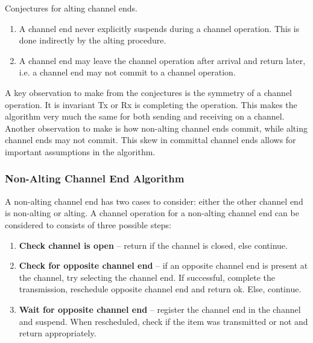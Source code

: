 \begin{enumeratefloat}
    \caption{Conjectures for alting channel ends.}
    \label{list:conjecture_alting}
    \begin{enumerate}[topsep=0em,itemsep=-1em,partopsep=0.5em,parsep=1em]
        \item A channel end never explicitly suspends during a channel operation. This is done indirectly by the alting procedure.
        \item A channel end may leave the channel operation after arrival and return later, i.e. a channel end may not commit to a channel operation.
    \end{enumerate}
\end{enumeratefloat}

\FloatBarrier

A key observation to make from the conjectures is the symmetry of a channel operation. It is invariant Tx or Rx is completing the operation. This makes the algorithm very much the same for both sending and receiving on a channel. Another observation to make is how non\hyp{}alting channel ends commit, while alting channel ends may not commit. This skew in committal channel ends allows for important assumptions in the algorithm.


\subsubsection{Non\hyp{}Alting Channel End Algorithm}

A non\hyp{}alting channel end has two cases to consider: either the other channel end is non\hyp{}alting or alting. 
A channel operation for a non\hyp{}alting channel end can be considered to consists of three possible steps:

\begin{enumerate}[topsep=0em,itemsep=-1em,partopsep=0.5em,parsep=1em]
    \item \textbf{Check channel is open} -- return if the channel is closed, else continue.
    \item \textbf{Check for opposite channel end} -- if an opposite channel end is present at the channel, try selecting the channel end. If successful, complete the transmission, reschedule opposite channel end and return ok. Else, continue.
    \label{step:channel_nonalt_complete}
    \item \textbf{Wait for opposite channel end} -- register the channel end in the channel and suspend. When rescheduled, check if the item was transmitted or not and return appropriately.
    \label{step:channel_nonalt_wait}
\end{enumerate}

